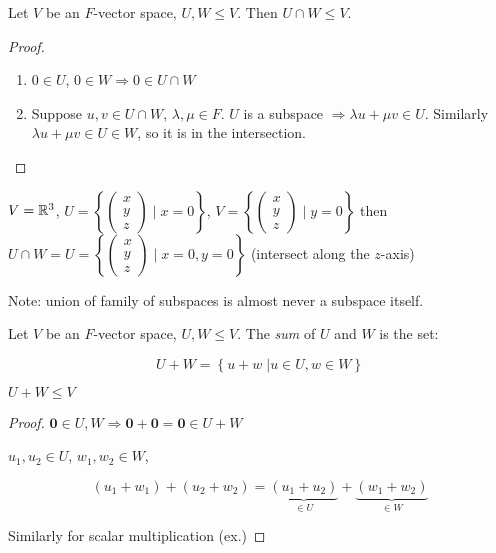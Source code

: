 \documentclass[a4paper]{article}
\begin{document}
\begin{prop} 
	Let $ V $ be an $ F $-vector space, $ U,W \leq V $. Then $ U \cap W \leq V $.	
\end{prop}

\begin{proof}
	\begin{enumerate}
		\item 	$ 0 \in U $, $ 0 \in W  \Rightarrow 0 \in U \cap W $ 
		\item Suppose $ u,v \in U \cap W $, $ \lambda, \mu \in F $.
		$ U $ is a subspace $ \Rightarrow  \lambda u + \mu v \in U $. Similarly $ \lambda u + \mu v \in U \in W $, so it is in the intersection. 
	\end{enumerate}
\end{proof}

\begin{eg}
	$ V = \mathbb{R}^{3} $, $ U = \left\{ \begin{pmatrix}
	x\\
	y\\
	z
	\end{pmatrix} \; | \; x = 0 \right\} $, $ V = \left\{ \begin{pmatrix}
	x\\
	y\\
	z
	\end{pmatrix} \; | \; y = 0 \right\}  $ then $ U \cap W = U = \left\{ \begin{pmatrix}
	x\\
	y\\
	z
	\end{pmatrix} \; | \; x = 0, y= 0 \right\}  $ (intersect along the $ z $-axis)
\end{eg}

Note: union of family of subspaces is almost never a subspace itself.


\begin{defi}
	Let $ V $ be an $ F $-vector space, $ U,W \leq V $. The \emph{sum} of $ U $ and $ W $ is the set:
	
	\[ U + W = \left\{  u + w \; | u \in U, w \in W    \right\}  \]
\end{defi}

\begin{prop} 
	$ U + W \leq V $
\end{prop}

\begin{proof}
	$ \mathbf{0} \in U,W \Rightarrow \mathbf{0} + \mathbf{0} = \mathbf{0} \in U + W $
	
	$ u_{1},u_{2} \in U $, $ w_{1},w_{2} \in W $, 
	
	\[ (u_{1} + w_{1}) + (u_{2} + w_{2}) = \underbrace{(u_{1} + u_{2})}_{\in U}  + \underbrace{(w_{1} + w_{2})}_{\in W} \]
	
	Similarly for scalar multiplication (ex.)
\end{proof}
\end{document}
